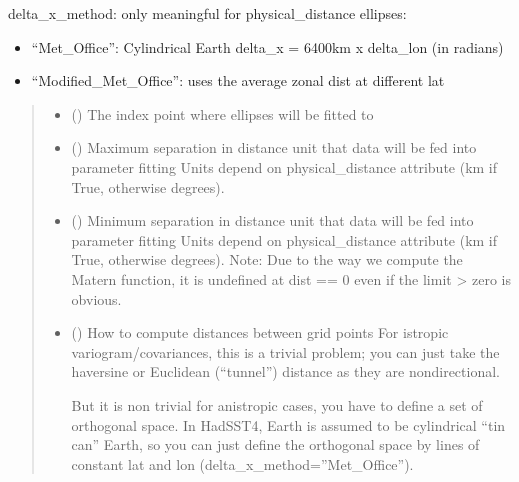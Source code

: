 \documentclass[letterpaper,10pt,english]{sphinxmanual}
\begin{document}
\begin{fulllineitems}
\begin{fulllineitems}
\sphinxAtStartPar
delta\_x\_method: only meaningful for physical\_distance ellipses:
\begin{itemize}
\item {}
\sphinxAtStartPar
“Met\_Office”: Cylindrical Earth delta\_x = 6400km x delta\_lon
(in radians)

\item {}
\sphinxAtStartPar
“Modified\_Met\_Office”: uses the average zonal dist at different
lat

\end{itemize}
\begin{quote}\begin{description}
\begin{itemize}
\item {}
\sphinxAtStartPar
{} () \textendash{} The index point where ellipses will be fitted to

\item {}
\sphinxAtStartPar
{} () \textendash{} Maximum separation in distance unit that data will be fed
into parameter fitting
Units depend on physical\_distance attribute (km if True, otherwise
degrees).

\item {}
\sphinxAtStartPar
{} () \textendash{} Minimum separation in distance unit that data
will be fed into parameter fitting
Units depend on physical\_distance attribute (km if True, otherwise
degrees).
Note: Due to the way we compute the Matern function,
it is undefined at dist == 0 even if the limit \sphinxhyphen{}\textgreater{} zero is obvious.

\item {}
\sphinxAtStartPar
{} () \textendash{}
\sphinxAtStartPar
How to compute distances between grid points
For istropic variogram/covariances, this is a trivial problem;
you can just take the haversine or
Euclidean (“tunnel”) distance as they are non\sphinxhyphen{}directional.

\sphinxAtStartPar
But it is non trivial for anistropic cases,
you have to define a set of orthogonal space. In HadSST4,
Earth is assumed to be cylindrical “tin can” Earth,
so you can just define the orthogonal space by
lines of constant lat and lon (delta\_x\_method=”Met\_Office”).


\end{itemize}
\end{description}
\end{quote}
\end{fulllineitems}
\end{fulllineitems}
\end{document}

